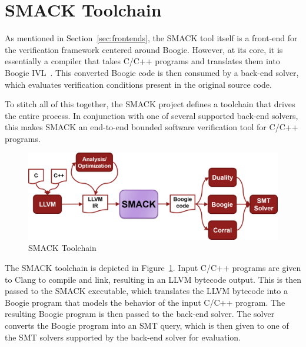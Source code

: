 \section{SMACK Toolchain}\label{sec:smacktoolchain}
As mentioned in Section~\ref{sec:frontends}, the SMACK tool itself is
a front-end for the verification framework centered around Boogie.
However, at its core, it is essentially a compiler that takes C/C++
programs and translates them into Boogie IVL~\cite{smack}.  This
converted Boogie code is then consumed by a back-end solver, which
evaluates verification conditions present in the original source
code.

To stitch all of this together, the SMACK project defines a toolchain
that drives the entire process.  In conjunction with one of several
supported back-end solvers, this makes SMACK an end-to-end bounded
software verification tool for C/C++ programs.

\begin{figure}[!ht]
  \includegraphics[width=1\textwidth]{SmackToolchain.png} 
  \caption{SMACK Toolchain}
  \label{fig:SMACKToolchain}
\end{figure}

The SMACK toolchain is depicted in Figure~\ref{fig:SMACKToolchain}.
Input C/C++ programs are given to Clang to compile and link, resulting
in an LLVM bytecode output.  This is then passed to the SMACK
executable, which translates the LLVM bytecode into a Boogie program
that models the behavior of the input C/C++ program.  The resulting
Boogie program is then passed to the back-end solver.  The solver
converts the Boogie program into an SMT query, which is then given to
one of the SMT solvers supported by the back-end solver for
evaluation. 

